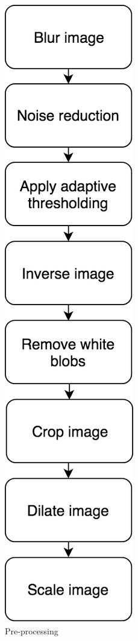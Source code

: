 \documentclass[12pt, a4paper, oneside]{article}
\begin{document}
    		\begin{figure}[H]
    			\begin{center}
    				\includegraphics[scale=0.4]{preProcess.png}
    				\caption{Pre-processing}
    				\label{fig:Pre-processing}
    			\end{center}
    		\end{figure}
    
\end{document}
